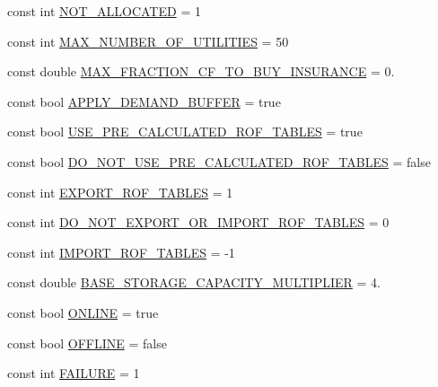 \begin{DoxyCompactItemize}
\item 
const int \mbox{\hyperlink{namespaceConstants_a2cc0fab82afeeae81786ee3a0ce6ffd5}{N\+O\+T\+\_\+\+A\+L\+L\+O\+C\+A\+T\+ED}} = 1
\item 
const int \mbox{\hyperlink{namespaceConstants_a456bb204b432ca85d517cdf525f19f88}{M\+A\+X\+\_\+\+N\+U\+M\+B\+E\+R\+\_\+\+O\+F\+\_\+\+U\+T\+I\+L\+I\+T\+I\+ES}} = 50
\item 
const double \mbox{\hyperlink{namespaceConstants_a17512938d5dc372ac321263e35d4022e}{M\+A\+X\+\_\+\+F\+R\+A\+C\+T\+I\+O\+N\+\_\+\+C\+F\+\_\+\+T\+O\+\_\+\+B\+U\+Y\+\_\+\+I\+N\+S\+U\+R\+A\+N\+CE}} = 0.
\item 
const bool \mbox{\hyperlink{namespaceConstants_a6d0d721f1c6d8807ddeb8b80eb165108}{A\+P\+P\+L\+Y\+\_\+\+D\+E\+M\+A\+N\+D\+\_\+\+B\+U\+F\+F\+ER}} = true
\item 
const bool \mbox{\hyperlink{namespaceConstants_a0c69d51d8e08085d471b00c76429814d}{U\+S\+E\+\_\+\+P\+R\+E\+\_\+\+C\+A\+L\+C\+U\+L\+A\+T\+E\+D\+\_\+\+R\+O\+F\+\_\+\+T\+A\+B\+L\+ES}} = true
\item 
const bool \mbox{\hyperlink{namespaceConstants_a192db63969de3947979b65b4b85f3c40}{D\+O\+\_\+\+N\+O\+T\+\_\+\+U\+S\+E\+\_\+\+P\+R\+E\+\_\+\+C\+A\+L\+C\+U\+L\+A\+T\+E\+D\+\_\+\+R\+O\+F\+\_\+\+T\+A\+B\+L\+ES}} = false
\item 
const int \mbox{\hyperlink{namespaceConstants_a499714392cf1a633678cc58ebd2868fd}{E\+X\+P\+O\+R\+T\+\_\+\+R\+O\+F\+\_\+\+T\+A\+B\+L\+ES}} = 1
\item 
const int \mbox{\hyperlink{namespaceConstants_a8237ceba4a3f169b0a547b6a6d794955}{D\+O\+\_\+\+N\+O\+T\+\_\+\+E\+X\+P\+O\+R\+T\+\_\+\+O\+R\+\_\+\+I\+M\+P\+O\+R\+T\+\_\+\+R\+O\+F\+\_\+\+T\+A\+B\+L\+ES}} = 0
\item 
const int \mbox{\hyperlink{namespaceConstants_aa64d03395b183f56f6f79d0701324ad1}{I\+M\+P\+O\+R\+T\+\_\+\+R\+O\+F\+\_\+\+T\+A\+B\+L\+ES}} = -\/1
\item 
const double \mbox{\hyperlink{namespaceConstants_a057a0def6be60913ea568f5aa9d05ef2}{B\+A\+S\+E\+\_\+\+S\+T\+O\+R\+A\+G\+E\+\_\+\+C\+A\+P\+A\+C\+I\+T\+Y\+\_\+\+M\+U\+L\+T\+I\+P\+L\+I\+ER}} = 4.
\item 
const bool \mbox{\hyperlink{namespaceConstants_a478993fe9b060f100867f2645bdc0baa}{O\+N\+L\+I\+NE}} = true
\item 
const bool \mbox{\hyperlink{namespaceConstants_a1e15aca4aeb3be807e35675fc09af563}{O\+F\+F\+L\+I\+NE}} = false
\item 
const int \mbox{\hyperlink{namespaceConstants_ad5c946a1cf9d445d7753d3f30a39bf6e}{F\+A\+I\+L\+U\+RE}} = 1

\end{DoxyCompactItemize}
